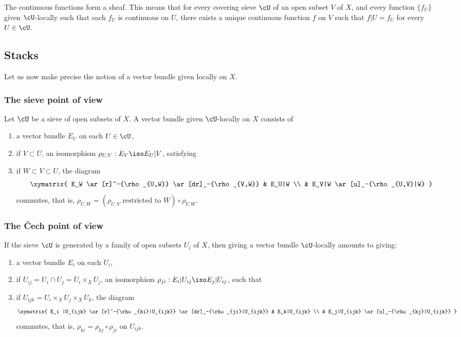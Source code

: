 \documentclass[oneside]{book}
\begin{document}
The continuous functions form a sheaf. This means that for every covering
sieve $\cU$ of an open subset $V$ of $X$, and every function
$\{f_U\}$ given $\cU$-locally such that each $f_U$ is continuous on
$U$, there exists a unique continuous function $f$ on $V$ such that
$f|U=f_U$ for every $U\in \cU$.

\subsection{Stacks}\label{I:1-3}

Let us now make precise the notion of a vector bundle given locally on $X$.

\subsubsection{The sieve point of view}\label{I:1-3-1}

Let $\cU$ be a sieve of open subsets of $X$. A vector bundle given
$\cU$-locally on $X$ consists of
\begin{enumerate}[\indent a)]
  \item a vector bundle $E_U$ on each $U\in \cU$,
  \item if $V\subset U$, an isomorphism
    $\rho_{U,V}:E_V\iso E_U|V$, satisfying
  \item if $W\subset V\subset U$, the diagram
    \[\xymatrix{
      E_W \ar[r]^-{\rho_{U,W}} \ar[dr]_-{\rho_{V,W}}
        & E_U|W \\
      & E_V|W \ar[u]_-{\rho_{U,V}|W}
    }\]
    commutes, that is,
    $\rho_{U,W} = (\mbox{$\rho_{U,V}$ restricted to $W$}) \circ \rho_{V,W}$.
\end{enumerate}

\subsubsection{The Čech point of view}\label{I:1-3-2}

If the sieve $\cU$ is generated by a family of open subsets $U_i$ of
$X$, then giving a vector bundle $\cU$-locally amounts to giving:
\begin{enumerate}[\indent a)]
  \item a vector bundle $E_i$ on each $U_i$,
  \item if $U_{ij}=U_i\cap U_j=U_i\times_X U_j$, an isomorphism
    $\rho_{ji}:E_i|U_{ij}\iso E_j|U_{ij}$, such that
  \item if $U_{ijk}=U_i\times_X U_j\times_X U_k$, the diagram
    \[\xymatrix{
      E_i |U_{ijk} \ar[r]^-{\rho_{ki}|U_{ijk}} \ar[dr]_-{\rho_{ji}|U_{ijk}}
        & E_k|U_{ijk} \\
      & E_j|U_{ijk} \ar[u]_-{\rho_{kj}|U_{ijk}}
    }\]
    commutes, that is, $\rho_{ki}=\rho_{kj}\circ\rho_{ji}$ on
    $U_{ijk}$.
\end{enumerate}
\end{document}
